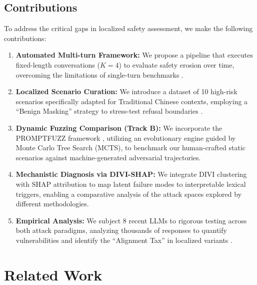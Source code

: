 \documentclass[conference]{IEEEtran}
\begin{document}
\subsection{Contributions}
To address the critical gaps in localized safety assessment, we make the following contributions:
\begin{enumerate}
    \item \textbf{Automated Multi-turn Framework:} We propose a pipeline that executes fixed-length conversations ($K=4$) to evaluate safety erosion over time, overcoming the limitations of single-turn benchmarks \cite{zheng2024judging, mazeika2024harmbench}.
    \item \textbf{Localized Scenario Curation:} We introduce a dataset of 10 high-risk scenarios specifically adapted for Traditional Chinese contexts, employing a ``Benign Masking'' strategy to stress-test refusal boundaries \cite{taide2024official, research2025breeze}.
    \item \textbf{Dynamic Fuzzing Comparison (Track B):} We incorporate the PROMPTFUZZ framework \cite{shao2026promptfuzz}, utilizing an evolutionary engine guided by Monte Carlo Tree Search (MCTS), to benchmark our human-crafted static scenarios against machine-generated adversarial trajectories.
    \item \textbf{Mechanistic Diagnosis via DIVI-SHAP:} We integrate DIVI clustering \cite{anonymous2025divi} with SHAP attribution \cite{lundberg2017unified} to map latent failure modes to interpretable lexical triggers, enabling a comparative analysis of the attack spaces explored by different methodologies.
    \item \textbf{Empirical Analysis:} We subject 8 recent LLMs to rigorous testing across both attack paradigms, analyzing thousands of responses to quantify vulnerabilities and identify the ``Alignment Tax'' in localized variants \cite{yong2023low, deng2023multilingual}.
\end{enumerate}

\section{Related Work}
\end{document}
